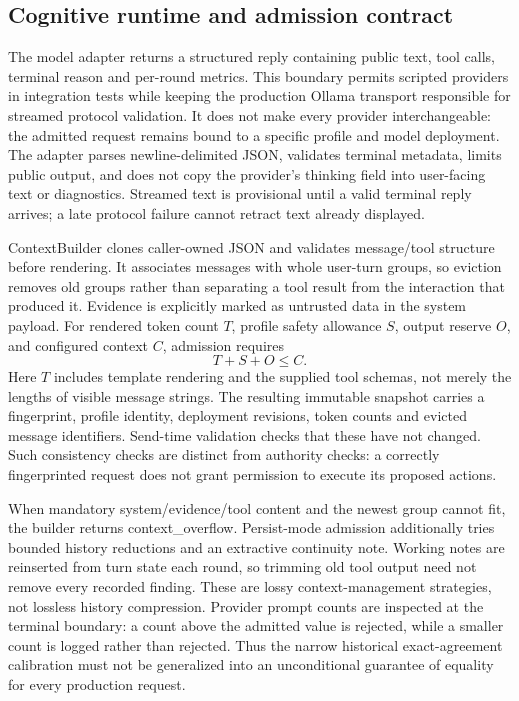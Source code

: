 \subsection{Cognitive runtime and admission contract}
The model adapter returns a structured reply containing public text, tool calls, terminal reason and per-round metrics. This boundary permits scripted providers in integration tests while keeping the production Ollama transport responsible for streamed protocol validation. It does not make every provider interchangeable: the admitted request remains bound to a specific profile and model deployment. The adapter parses newline-delimited JSON, validates terminal metadata, limits public output, and does not copy the provider's thinking field into user-facing text or diagnostics. Streamed text is provisional until a valid terminal reply arrives; a late protocol failure cannot retract text already displayed.

ContextBuilder clones caller-owned JSON and validates message/tool structure before rendering. It associates messages with whole user-turn groups, so eviction removes old groups rather than separating a tool result from the interaction that produced it. Evidence is explicitly marked as untrusted data in the system payload. For rendered token count $T$, profile safety allowance $S$, output reserve $O$, and configured context $C$, admission requires
\begin{equation}
T + S + O \leq C.
\end{equation}
Here $T$ includes template rendering and the supplied tool schemas, not merely the lengths of visible message strings. The resulting immutable snapshot carries a fingerprint, profile identity, deployment revisions, token counts and evicted message identifiers. Send-time validation checks that these have not changed. Such consistency checks are distinct from authority checks: a correctly fingerprinted request does not grant permission to execute its proposed actions.

When mandatory system/evidence/tool content and the newest group cannot fit, the builder returns context\_overflow. Persist-mode admission additionally tries bounded history reductions and an extractive continuity note. Working notes are reinserted from turn state each round, so trimming old tool output need not remove every recorded finding. These are lossy context-management strategies, not lossless history compression. Provider prompt counts are inspected at the terminal boundary: a count above the admitted value is rejected, while a smaller count is logged rather than rejected. Thus the narrow historical exact-agreement calibration must not be generalized into an unconditional guarantee of equality for every production request.

